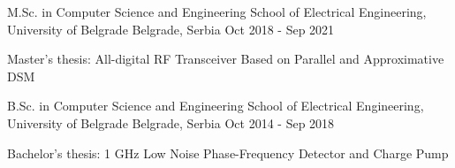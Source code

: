 


\begin{cventries}


\cventry
{M.Sc. in Computer Science and Engineering} %
{School of Electrical Engineering, University of Belgrade} %
{Belgrade, Serbia} %
{Oct 2018 - Sep 2021} %
{ %
\begin{cvitems}
\item {Master's thesis: All-digital RF Transceiver Based on Parallel and Approximative DSM}
\end{cvitems}
}

\cventry
{B.Sc. in Computer Science and Engineering} %
{School of Electrical Engineering, University of Belgrade} %
{Belgrade, Serbia} %
{Oct 2014 - Sep 2018} %
{ %
\begin{cvitems}
\item {Bachelor's thesis: 1 GHz Low Noise Phase-Frequency Detector and Charge Pump}
\end{cvitems}
}


\end{cventries}